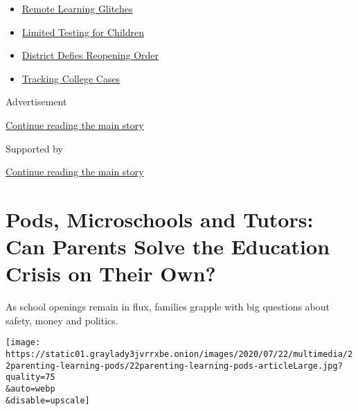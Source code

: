 \begin{itemize}
\tightlist
\item
  \href{https://www.nytimes3xbfgragh.onion/2020/09/08/us/school-districts-cyberattacks-glitches.html?name=styln-coronavirus-schools-reopening\&region=TOP_BANNER\&block=storyline_menu_recirc\&action=click\&pgtype=Article\&impression_id=ce3b7611-f4b6-11ea-b916-45f6d9eb4786\&variant=undefined}{Remote
  Learning Glitches}
\item
  \href{https://www.nytimes3xbfgragh.onion/2020/09/08/upshot/children-testing-shortfalls-virus.html?name=styln-coronavirus-schools-reopening\&region=TOP_BANNER\&block=storyline_menu_recirc\&action=click\&pgtype=Article\&impression_id=ce3b9d20-f4b6-11ea-b916-45f6d9eb4786\&variant=undefined}{Limited
  Testing for Children}
\item
  \href{https://www.nytimes3xbfgragh.onion/2020/09/10/us/des-moines-school-opening-coronavirus.html?name=styln-coronavirus-schools-reopening\&region=TOP_BANNER\&block=storyline_menu_recirc\&action=click\&pgtype=Article\&impression_id=ce3b9d21-f4b6-11ea-b916-45f6d9eb4786\&variant=undefined}{District
  Defies Reopening Order}
\item
  \href{https://www.nytimes3xbfgragh.onion/interactive/2020/us/covid-college-cases-tracker.html?name=styln-coronavirus-schools-reopening\&region=TOP_BANNER\&block=storyline_menu_recirc\&action=click\&pgtype=Article\&impression_id=ce3b9d22-f4b6-11ea-b916-45f6d9eb4786\&variant=undefined}{Tracking
  College Cases}
\end{itemize}

Advertisement

\protect\hyperlink{after-top}{Continue reading the main story}

Supported by

\protect\hyperlink{after-sponsor}{Continue reading the main story}

\hypertarget{pods-microschools-and-tutors-can-parents-solve-the-education-crisis-on-their-own}{%
\section{Pods, Microschools and Tutors: Can Parents Solve the Education
Crisis on Their
Own?}\label{pods-microschools-and-tutors-can-parents-solve-the-education-crisis-on-their-own}}

As school openings remain in flux, families grapple with big questions
about safety, money and politics.

\texttt{[image: https://static01.graylady3jvrrxbe.onion/images/2020/07/22/multimedia/22parenting-learning-pods/22parenting-learning-pods-articleLarge.jpg?quality=75\\\&auto=webp\\\&disable=upscale]}


